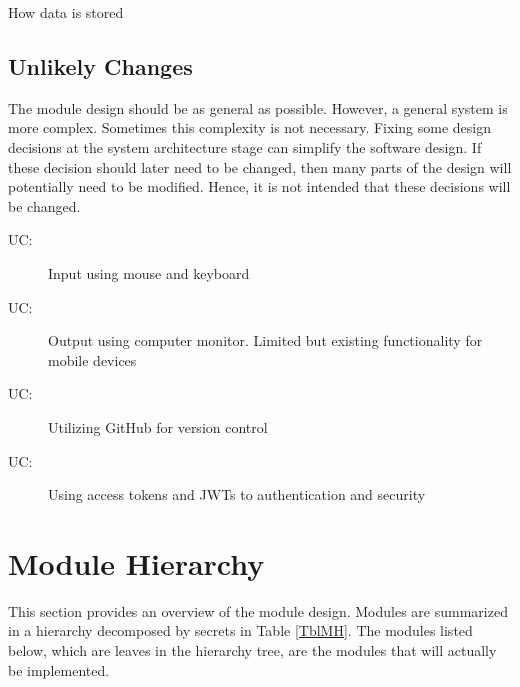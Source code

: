 \documentclass[12pt, titlepage]{article}
\newcounter{acnum}
\newcommand{\actheacnum}{AC\theacnum}
\newcounter{ucnum}
\newcommand{\uctheucnum}{UC\theucnum}
\begin{document}
\begin{description}
		
		
		\item[\refstepcounter{acnum} \actheacnum \label{ac51}:]  How data is stored
	\end{description}
	
	\subsection{Unlikely Changes} \label{SecUchange}
	
	The module design should be as general as possible. However, a general system is
	more complex. Sometimes this complexity is not necessary. Fixing some design
	decisions at the system architecture stage can simplify the software design. If
	these decision should later need to be changed, then many parts of the design
	will potentially need to be modified. Hence, it is not intended that these
	decisions will be changed.
	
	\begin{description}
		\item[ \uctheucnum \label{uc1}:] Input using mouse and keyboard
		\item[ \uctheucnum \label{uc2}:] Output using computer monitor. Limited but existing functionality for mobile devices
		\item[ \uctheucnum \label{uc2}:] Utilizing GitHub for version control
		\item[ \uctheucnum \label{uc2}:] Using access tokens and JWTs to authentication and security
	\end{description}
	
	\section{Module Hierarchy} \label{SecMH}
	
	This section provides an overview of the module design. Modules are summarized
	in a hierarchy decomposed by secrets in Table \ref{TblMH}. The modules listed
	below, which are leaves in the hierarchy tree, are the modules that will
	actually be implemented.
	
\end{document}
